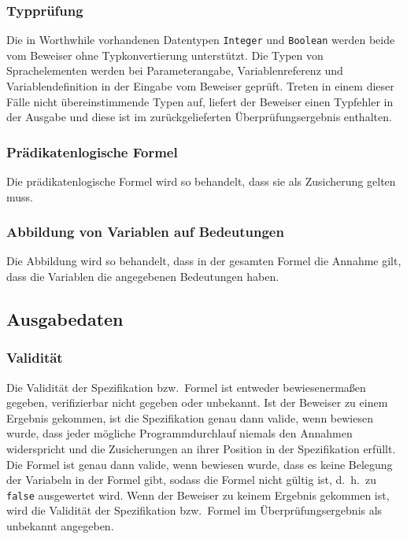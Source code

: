 \subsubsection{Typprüfung}%

Die in Worthwhile vorhandenen Datentypen \texttt{Integer} und
\texttt{Boolean} werden beide vom Beweiser ohne Typkonvertierung
unterstützt. Die Typen von Sprachelementen werden bei Parameterangabe,
Variablenreferenz und Variablendefinition in der Eingabe vom Beweiser
geprüft. Treten in einem dieser Fälle nicht übereinstimmende Typen
auf, liefert der Beweiser einen Typfehler in der Ausgabe und diese ist
im zurückgelieferten Überprüfungsergebnis enthalten.%

\subsubsection{Prädikatenlogische Formel}%

Die prädikatenlogische Formel wird so behandelt, dass sie als
Zusicherung gelten muss.%

\subsubsection{Abbildung von Variablen auf Bedeutungen}%

Die Abbildung wird so behandelt, dass in der gesamten Formel die
Annahme gilt, dass die Variablen die angegebenen Bedeutungen haben.%

\subsection{Ausgabedaten}%

\subsubsection{Validität}%

Die Validität der Spezifikation bzw.\ Formel ist entweder
bewiesenermaßen gegeben, verifizierbar nicht gegeben oder unbekannt.
Ist der Beweiser zu einem Ergebnis gekommen, ist die Spezifikation
genau dann valide, wenn bewiesen wurde, dass jeder mögliche
Programmdurchlauf niemals den Annahmen widerspricht und die
Zusicherungen an ihrer Position in der Spezifikation erfüllt. Die
Formel ist genau dann valide, wenn bewiesen wurde, dass es keine
Belegung der Variabeln in der Formel gibt, sodass die Formel nicht
gültig ist, d.~h.\ zu \texttt{false} ausgewertet wird. Wenn der
Beweiser zu keinem Ergebnis gekommen ist, wird die Validität der
Spezifikation bzw.\ Formel im Überprüfungsergebnis als unbekannt
angegeben.%

